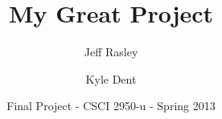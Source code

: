\documentclass[11pt]{article}
\begin{document}
\title{My Great Project}
\author{Jeff Rasley \and Kyle Dent}
\date{Final Project - CSCI 2950-u - Spring 2013}
\maketitle









\end{document}
